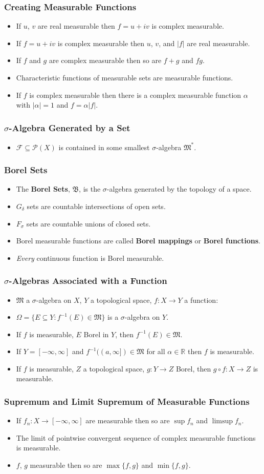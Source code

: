 \documentclass{article}
\newcounter{topicnumber}[section]
\newcommand{\steptopic}[1][1]{\addtocounter{topicnumber}{#1}}
\newenvironment{topic}[1]{%
\steptopic%
\subsubsection{#1}%
\begin{itemize}%
}{%
\end{itemize}%
}
\newcommand{\term}[1]{{\bf #1}}
\newcommand{\setup}{\item[\null]}
\newcommand{\remark}{\item}
\newcommand{\powerset}{\mathscr{P}}
\begin{document}
\begin{topic}{Creating Measurable Functions}
\remark If $u$, $v$ are real measurable then $f = u + iv$ is complex measurable.
\remark If $f = u + iv$ is complex measurable then $u$, $v$, and $|f|$ are real measurable.
\remark If $f$ and $g$ are complex measurable then so are $f + g$ and $fg$.
\remark Characteristic functions of measurable sets are measurable functions.
\remark If $f$ is complex measurable then there is a complex measurable function $\alpha$ with $|\alpha| = 1$ and $f = \alpha |f|$.
\end{topic}

\begin{topic}{$\sigma$-Algebra Generated by a Set}
\remark $\mathscr{F} \subseteq \powerset(X)$ is contained in some smallest $\sigma$-algebra $\mathfrak{M}^\ast$.
\end{topic}

\begin{topic}{Borel Sets}
\remark The \term{Borel Sets}, $\mathfrak{B}$, is the $\sigma$-algebra generated by the topology of a space.
\remark $G_\delta$ sets are countable intersections of open sets.
\remark $F_\sigma$ sets are countable unions of closed sets.
\remark Borel measurable functions are called \term{Borel mappings} or \term{Borel functions}.
\remark {\em Every} continuous function is Borel measurable.
\end{topic}

\begin{topic}{$\sigma$-Algebras Associated with a Function}
\setup $\mathfrak{M}$ a $\sigma$-algebra on $X$, $Y$ a topological space, $f : X \to Y$ a function:
\remark $\Omega = \{ E \subseteq Y : f^{-1}(E) \in \mathfrak{M} \}$ is a $\sigma$-algebra on $Y$.
\remark If $f$ is measurable, $E$ Borel in $Y$, then $f^{-1}(E) \in \mathfrak{M}$.
\remark If $Y = [-\infty, \infty]$ and $f^{-1}((a, \infty]) \in \mathfrak{M}$ for all $\alpha \in \mathbb{R}$ then $f$ is measurable.
\remark If $f$ is measurable, $Z$ a topological space, $g : Y \to Z$ Borel, then $g \circ f : X \to Z$ is measurable.
\end{topic}

\steptopic

\begin{topic}{Supremum and Limit Supremum of Measurable Functions}
\remark If $f_n : X \to [-\infty, \infty]$ are measurable then so are $\sup f_n$ and $\limsup f_n.$
\remark The limit of pointwise convergent sequence of complex measurable functions is measurable.
\remark $f$, $g$ measurable then so are $\max\{f, g\}$ and $\min\{f,g\}$.
\end{topic}
\end{document}
